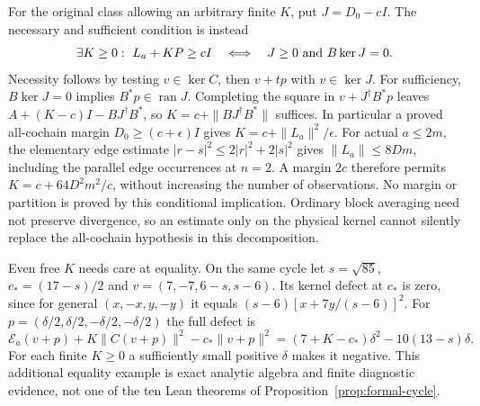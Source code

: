\documentclass[11pt]{article}
\newcommand{\E}{\mathcal E}
\begin{document}
For the original class allowing an arbitrary finite $K$, put $J=D_0-cI$.
The necessary and sufficient condition is instead
\begin{equation}\label{eq:free-penalty}
 \exists K\geq0:\ L_a+KP\geq cI
 \quad\Longleftrightarrow\quad J\geq0\ \hbox{and }B\ker J=0.
\end{equation}
Necessity follows by testing $v\in\ker C$, then $v+tp$ with $v\in\ker J$.
For sufficiency, $B\ker J=0$ implies $B^*p\in\operatorname{ran}J$.
Completing the square in $v+J^\dagger B^*p$ leaves
$A+(K-c)I-BJ^\dagger B^*$, so $K=c+\|BJ^\dagger B^*\|$ suffices.
In particular a proved all-cochain margin $D_0\geq(c+\epsilon)I$ gives
$K=c+\|L_a\|^2/\epsilon$. For actual $a\leq2m$, the elementary edge estimate
$|r-s|^2\leq2|r|^2+2|s|^2$ gives $\|L_a\|\leq8Dm$, including the parallel
edge occurrences at $n=2$. A margin $2c$ therefore permits
$K=c+64D^2m^2/c$, without increasing the number of observations.
No margin or partition is proved by this conditional implication. Ordinary block
averaging need not preserve divergence, so an estimate only on the physical kernel
cannot silently replace the all-cochain hypothesis in this decomposition.

Even free $K$ needs care at equality. On the same cycle let
$s=\sqrt{85}$, $c_*=(17-s)/2$ and $v=(7,-7,6-s,s-6)$. Its kernel defect at $c_*$
is zero, since for general $(x,-x,y,-y)$ it equals
$(s-6)[x+7y/(s-6)]^2$. For
$p=(\delta/2,\delta/2,-\delta/2,-\delta/2)$ the full defect is
\[
 \E_a(v+p)+K\|C(v+p)\|^2-c_*\|v+p\|^2
 =(7+K-c_*)\delta^2-10(13-s)\delta.
\]
For each finite $K\geq0$ a sufficiently small positive $\delta$ makes it negative.
This additional equality example is exact analytic algebra and finite diagnostic
evidence, not one of the ten Lean theorems of Proposition~\ref{prop:formal-cycle}.
\end{document}
